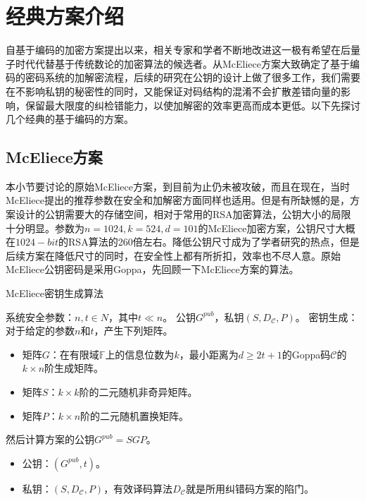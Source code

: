 \chapter{经典方案介绍}
\vspace{-0.2cm}
自基于编码的加密方案提出以来，相关专家和学者不断地改进这一极有希望在后量子时代代替基于传统数论的加密算法的候选者。从McEliece方案大致确定了基于编码的密码系统的加解密流程，后续的研究在公钥的设计上做了很多工作，我们需要在不影响私钥的秘密性的同时，又能保证对码结构的混淆不会扩散差错向量的影响，保留最大限度的纠检错能力，以使加解密的效率更高而成本更低。以下先探讨几个经典的基于编码的方案。
\section{McEliece方案}
本小节要讨论的原始McEliece方案，到目前为止仍未被攻破，而且在现在，当时McEliece提出的推荐参数在安全和加解密方面同样也适用。但是有所缺憾的是，方案设计的公钥需要大的存储空间，相对于常用的RSA加密算法，公钥大小的局限十分明显。参数为$n=1024,k=524,d=101$的McEliece加密方案，公钥尺寸大概在$1024-bit$的RSA算法的260倍左右。降低公钥尺寸成为了学者研究的热点，但是后续方案在降低尺寸的同时，在安全性上都有所折扣，效率也不尽人意。原始McEliece公钥密码是采用Goppa，先回顾一下McEliece方案的算法。

\begin{breakablealgorithm}
	\small
	\renewcommand{\algorithmicrequire}{\textbf{Input:}}
	\renewcommand{\algorithmicensure}{\textbf{Output:}}
	\caption{McEliece密钥生成算法}
	\label{alg:McElieceKeyGen}
	\begin{algorithmic}[1]		
		\Require
		系统安全参数：$n,t \in N$，其中$t \ll n$。
		\Ensure
		公钥$G^{pub}$，私钥$(S,D_\mathcal{C},P)$。
		\State
		密钥生成：对于给定的参数$n$和$t$，产生下列矩阵。
		\begin{itemize}
			\item 矩阵$G$：在有限域$\mathbb{F}$上的信息位数为$k$，最小距离为$d \geq 2t + 1$的Goppa码$\mathcal{C}$的$k \times n$阶生成矩阵。
			\item 矩阵$S$：$k \times k$阶的二元随机非奇异矩阵。
			\item 矩阵$P$：$k \times n$阶的二元随机置换矩阵。
		\end{itemize}	    
		\State
		然后计算方案的公钥$G^{pub} = SGP$。
		\begin{itemize}
			\item 公钥：$(G^{pub},t)$。
			\item 私钥：$(S,D_\mathcal{C},P)$，有效译码算法$D_\mathcal{C}$就是所用纠错码方案的陷门。
		\end{itemize}
	\end{algorithmic}
\end{breakablealgorithm}


